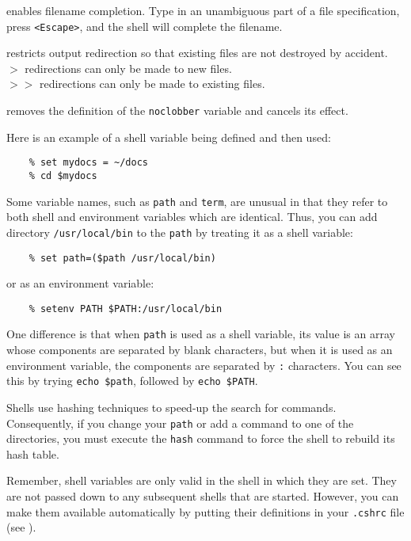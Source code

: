 \goodbreak

\exbegin

{enables filename completion.
Type in an unambiguous part of a file specification, press {\tt <Escape>}, and
the shell will complete the filename.}

{restricts output redirection so that existing files are not destroyed by
accident.\\
{\tt $>$} redirections can only be made to new files.\\
{\tt  $>>$} redirections can only be made to existing files.}

{removes the definition of the {\tt noclobber} variable and cancels its effect.}

\exend

Here is an example of a shell variable being defined and then used:
\begin{verbatim}
    % set mydocs = ~/docs
    % cd $mydocs
\end{verbatim}

Some variable names, such as {\tt path} and {\tt term}, are unusual in that
they refer to both shell and environment variables which are identical.
Thus, you can add directory {\tt /usr/local/bin} to the {\tt path} by treating
it as a shell variable:
\begin{verbatim}
    % set path=($path /usr/local/bin)
\end{verbatim}
or as an environment variable:
\begin{verbatim}
    % setenv PATH $PATH:/usr/local/bin
\end{verbatim}
One difference is that when {\tt path} is used as a shell variable, its value is
an array whose components are separated by blank characters, but when it is
used as an environment variable, the components are separated by {\tt :}
characters.
You can see this by trying {\tt echo \$path}, followed by {\tt echo \$PATH}.

Shells use hashing techniques to speed-up the search for commands.
Consequently, if you change your {\tt path} or add a command to one of
the directories, you must execute the {\tt hash} command to force the shell
to rebuild its hash table.

Remember, shell variables are only valid in the shell in which they are set.
They are not passed down to any subsequent shells that are started.
However, you can make them available automatically by putting their definitions
in your {\tt .cshrc} file (see ).

